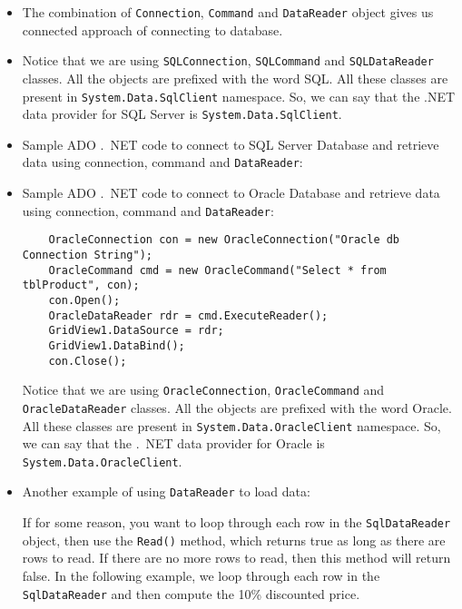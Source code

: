 \begin{itemize}
	\item The combination of \texttt{Connection}, \texttt{Command} and \texttt{DataReader} object gives us connected approach of
	connecting to database.
	\item Notice that we are using \texttt{SQLConnection}, \texttt{SQLCommand} and \texttt{SQLDataReader} classes. All the objects
	are prefixed with the word SQL. All these classes are present in \verb|System.Data.SqlClient| namespace. So,
	we can say that the .NET data provider for SQL Server is \verb|System.Data.SqlClient|.
	\item Sample ADO .\ NET code to connect to SQL Server Database and retrieve data using connection, command and \texttt{DataReader}:

	
	
	\item Sample ADO .\ NET code to connect to Oracle Database and retrieve data using connection, command and \texttt{DataReader}:
	
\begin{lstlisting}
	OracleConnection con = new OracleConnection("Oracle db Connection String");
	OracleCommand cmd = new OracleCommand("Select * from tblProduct", con);
	con.Open();
	OracleDataReader rdr = cmd.ExecuteReader();
	GridView1.DataSource = rdr;
	GridView1.DataBind();
	con.Close();
\end{lstlisting}
	Notice that we are using \texttt{OracleConnection}, \texttt{OracleCommand} and \texttt{OracleDataReader} classes. All the
objects are prefixed with the word Oracle. All these classes are present in \texttt{System.Data.OracleClient}
namespace. So, we can say that the .\ NET data provider for Oracle is \texttt{System.Data.OracleClient}.

\item Another example of using \texttt{DataReader} to load data:



If for some reason, you want to loop through each row in the \texttt{SqlDataReader} object, then use
the \texttt{Read()} method, which returns true as long as there are rows to read. If there are no more rows to
read, then this method will return false. In the following example, we loop through each row in
the \texttt{SqlDataReader} and then compute the 10\% discounted price.

\end{itemize}


